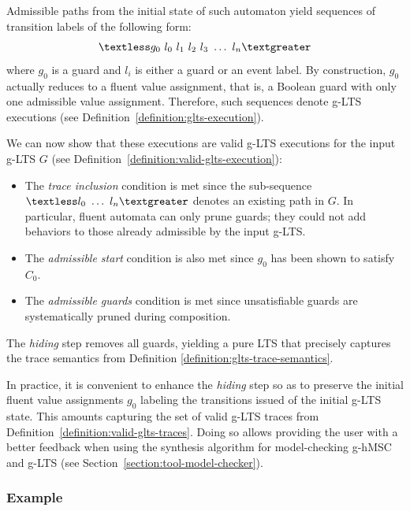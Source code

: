 Admissible paths from the initial state of such automaton yield sequences of transition labels of the following form:
\begin{align*}\textless g_0~l_0~l_1~l_2~l_3~\ldots~l_n \textgreater \end{align*}
where $g_0$ is a guard and $l_i$ is either a guard or an event label. By construction, $g_0$ actually reduces to a fluent value assignment, that is, a Boolean guard with only one admissible value assignment. Therefore, such sequences denote g-LTS executions (see Definition~\ref{definition:glts-execution}).

We can now show that these executions are valid g-LTS executions for the input g-LTS $G$ (see Definition~\ref{definition:valid-glts-execution}):
\begin{itemize}
\item The \emph{trace inclusion} condition is met since the sub-sequence $\textless l_0~\ldots~l_n \textgreater$ denotes an existing path in $G$. In particular, fluent automata can only prune guards; they could not add behaviors to those already admissible by the input g-LTS.
\item The \emph{admissible start} condition is also met since $g_0$ has been shown to satisfy $C_0$.
\item The \emph{admissible guards} condition is met since unsatisfiable guards are systematically pruned during composition.
\end{itemize}

The \emph{hiding} step removes all guards, yielding a pure LTS that precisely captures the trace semantics from Definition \ref{definition:glts-trace-semantics}. 

In practice, it is convenient to enhance the \emph{hiding} step so as to preserve the initial fluent value assignments $g_0$ labeling the transitions issued of the initial g-LTS state. This amounts capturing the set of valid g-LTS traces from Definition~\ref{definition:valid-glts-traces}. Doing so allows providing the user with a better feedback when using the synthesis algorithm for model-checking g-hMSC and g-LTS (see Section~\ref{section:tool-model-checker}).

\subsubsection*{Example}

